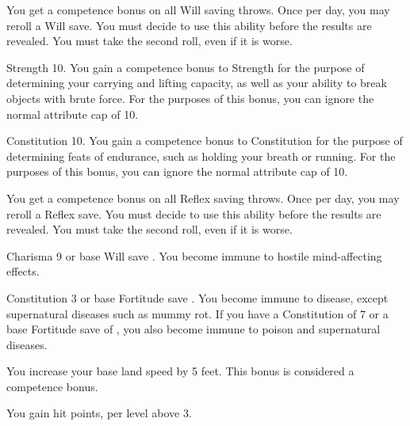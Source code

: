  You get a  competence bonus on all Will saving throws. Once per day, you may reroll a Will save. You must decide to use this ability before the results are revealed. You must take the second roll, even if it is worse.

\featpre Strength 10.
\featben You gain a  competence bonus to Strength for the purpose of determining your carrying and lifting capacity, as well as your ability to break objects with brute force. For the purposes of this bonus, you can ignore the normal attribute cap of 10.


\featpre Constitution 10.
\featben You gain a  competence bonus to Constitution for the purpose of determining feats of endurance, such as holding your breath or running. For the purposes of this bonus, you can ignore the normal attribute cap of 10.


 You get a  competence bonus on all Reflex saving throws. Once per day, you may reroll a Reflex save. You must decide to use this ability before the results are revealed. You must take the second roll, even if it is worse.

\featpre Charisma 9 or base Will save .
\featben You become immune to hostile mind-affecting effects.

\featpre Constitution 3 or base Fortitude save .
\featben You become immune to disease, except supernatural diseases such as mummy rot. If you have a Constitution of 7 or a base Fortitude save of , you also become immune to poison and supernatural diseases.


 You increase your base land speed by 5 feet. This bonus is considered a competence bonus.

 You gain  hit points,  per level above 3.


